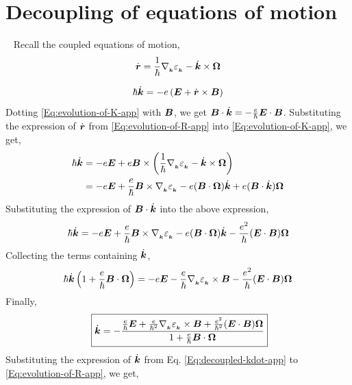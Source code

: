 \documentclass{report}
\renewcommand\vec[1]{\ensuremath\boldsymbol{#1}} %
\begin{document}
\chapter{Decoupling of equations of motion}~\label{app:decoupling-of-eom}
Recall the coupled equations of motion,
\begin{equation}\label{Eq:evolution-of-R-app}
	\dot{\vec{r}} = \frac{1}{\hbar} \nabla{_{_{\vec{k}}}} \varepsilon_{_{\vec{k}}} - \dot{\vec{k}} \times \vec{\Omega}
\end{equation}

\begin{equation}\label{Eq:evolution-of-K-app}
	\hbar \dot{\vec{k}} = -e\left(\vec{E} + \dot{\vec{r}} \times \vec{B} \right)
\end{equation}
Dotting \eqref{Eq:evolution-of-K-app} with $\vec{B}$, we get $\vec{B}\cdot \dot{\vec{k}} = -\frac{e}{\hbar} \vec{E}\cdot\vec{B}$.
Substituting the expression of $\dot{\vec{r}}$ from \eqref{Eq:evolution-of-R-app} into \eqref{Eq:evolution-of-K-app}, we get,
$$
\begin{aligned}
	\hbar \dot{\vec{k}} &= -e \vec{E} + e \vec{B} \times \left(\frac{1}{\hbar} \nabla{_{_{\vec{k}}}} \varepsilon_{_{\vec{k}}} - \dot{\vec{k}} \times \vec{\Omega} \right)\\
	& = -e \vec{E} + \frac{e}{\hbar} \vec{B} \times  \nabla{_{_{\vec{k}}}} \varepsilon_{_{\vec{k}}} - e (\vec{B} \cdot \vec{\Omega}) \dot{\vec{k}} + e (\vec{B} \cdot \dot{\vec{k}}) \vec{\Omega}\\
\end{aligned}
$$
Substituting the expression of $\vec{B} \cdot \dot{\vec{k}}$ into the above expression,
$$ \hbar \dot{\vec{k}} = -e \vec{E} + \frac{e}{\hbar} \vec{B} \times  \nabla{_{_{\vec{k}}}} \varepsilon_{_{\vec{k}}} - e (\vec{B} \cdot \vec{\Omega}) \dot{\vec{k}} - \frac{e^2}{\hbar} (\vec{E} \cdot \vec{B}) \vec{\Omega}
$$
Collecting the terms containing $\dot{\vec{k}}$,
$$
\hbar \dot{\vec{k}} \left(1 + \frac{e}{\hbar} \vec{B}\cdot\vec{\Omega}\right) = -e \vec{E} - \frac{e}{\hbar} \nabla{_{_{\vec{k}}}} \varepsilon_{_{\vec{k}}} \times \vec{B} - \frac{e^2}{\hbar} (\vec{E} \cdot \vec{B}) \vec{\Omega}
$$
Finally,
\begin{equation}~\label{Eq:decoupled-kdot-app}
\boxed{\dot{\vec{k}} = -\frac{\frac{e}{\hbar} \vec{E} + \frac{e}{\hbar^2} \nabla{_{_{\vec{k}}}} \varepsilon_{_{\vec{k}}} \times \vec{B} + \frac{e^2}{\hbar^2} (\vec{E} \cdot \vec{B}) \vec{\Omega}}{1 + \frac{e}{\hbar} \vec{B}\cdot\vec{\Omega}}}
\end{equation}
Substituting the expression of $\dot{\vec{k}}$ from Eq. \eqref{Eq:decoupled-kdot-app} to \eqref{Eq:evolution-of-R-app}, we get,
\end{document}
